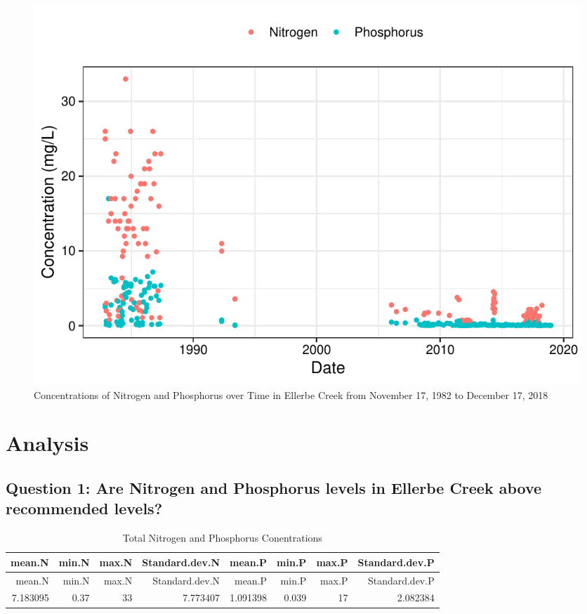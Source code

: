\documentclass[12pt,]{article}
\begin{document}
\begin{figure}
\centering
\includegraphics{Landman_ENV872_Project_files/figure-latex/Exploratory Analysis Figure 5-1.pdf}
\caption{Concentrations of Nitrogen and Phosphorus over Time in Ellerbe
Creek from November 17, 1982 to December 17, 2018}
\end{figure}

\newpage

\hypertarget{analysis}{%
\section{Analysis}\label{analysis}}

\hypertarget{question-1-are-nitrogen-and-phosphorus-levels-in-ellerbe-creek-above-recommended-levels}{%
\subsection{Question 1: Are Nitrogen and Phosphorus levels in Ellerbe
Creek above recommended
levels?}\label{question-1-are-nitrogen-and-phosphorus-levels-in-ellerbe-creek-above-recommended-levels}}

\begin{longtable}[]{@{}rrrrrrrr@{}}
\caption{Total Nitrogen and Phosphorus Conentrations}\tabularnewline
\toprule
mean.N & min.N & max.N & Standard.dev.N & mean.P & min.P & max.P &
Standard.dev.P\tabularnewline
\midrule
\endfirsthead
\toprule
mean.N & min.N & max.N & Standard.dev.N & mean.P & min.P & max.P &
Standard.dev.P\tabularnewline
\midrule
\endhead
7.183095 & 0.37 & 33 & 7.773407 & 1.091398 & 0.039 & 17 &
2.082384\tabularnewline
\bottomrule
\end{longtable}
\end{document}
